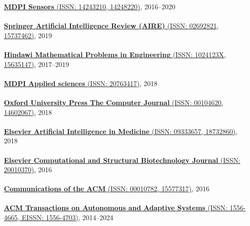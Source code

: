 \href{http://www.mdpi.com/journal/sensors}{\textbf{MDPI Sensors} (ISSN: 14243210, 14248220)}, 2016--2020
\\ \halfblankline \\
\href{https://link.springer.com/journal/10462}{\textbf{Springer Artificial Intelligence Review (AIRE)} (ISSN: 02692821, 15737462)}, 2019
\\ \halfblankline \\
\href{https://www.hindawi.com/journals/mpe/}{\textbf{Hindawi Mathematical Problems in Engineering} (ISSN: 1024123X, 15635147)}, 2017--2019
\\ \halfblankline \\
\href{http://www.mdpi.com/journal/applsci}{\textbf{MDPI Applied sciences} (ISSN: 20763417)}, 2018
\\ \halfblankline \\
\href{https://academic.oup.com/comjnl}{\textbf{Oxford University Press The Computer Journal} (ISSN: 00104620, 14602067)}, 2018
\\ \halfblankline \\
\href{https://www.journals.elsevier.com/artificial-intelligence-in-medicine/}{\textbf{Elsevier Artificial Intelligence in Medicine} (ISSN: 09333657, 18732860)}, 2018
\\ \halfblankline \\
\href{https://www.journals.elsevier.com/computational-and-structural-biotechnology-journal/}{\textbf{Elsevier Computational and Structural Biotechnology Journal} (ISSN: 20010370)}, 2016
\\ \halfblankline \\
\href{http://cacm.acm.org/}{\textbf{Communications of the ACM} (ISSN: 00010782, 15577317)}, 2016
\\ \halfblankline \\
\href{https://dl.acm.org/journal/taas}{\textbf{ACM Transactions on Autonomous and Adaptive Systems} (ISSN: 1556-4665, EISSN: 1556-4703)}, 2014--2024
